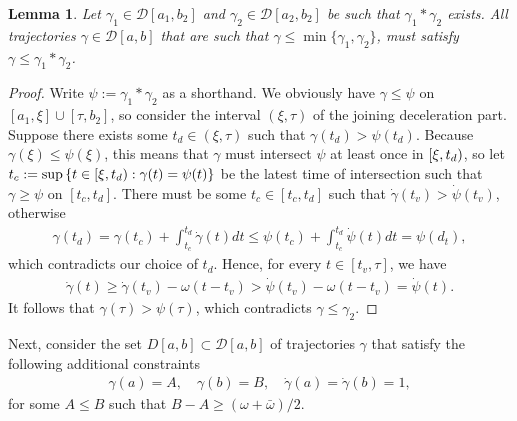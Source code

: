 \documentclass[a4paper]{article}
\theoremstyle{definition}
\theoremstyle{plain}
\newtheorem{lemma}{Lemma\hspace{0.25em}\ignorespaces}
\begin{document}
\begin{lemma}
  Let $\gamma_{1} \in \mathcal{D}[a_{1}, b_{2}]$ and
  $\gamma_{2} \in \mathcal{D}[a_{2}, b_{2}]$ be such that $\gamma_{1} * \gamma_{2}$ exists. All
  trajectories $\gamma \in \mathcal{D}[a, b]$ that are such that
  $\gamma \leq \min\{\gamma_{1}, \gamma_{2}\}$, must satisfy $\gamma \leq \gamma_{1} * \gamma_{2}$.
\end{lemma}
\begin{proof}
  Write $\psi := \gamma_{1} * \gamma_{2}$ as a shorthand. We obviously have
  $\gamma \leq \psi$ on $[a_{1}, \xi] \cup [\tau, b_{2}]$, so consider the interval $(\xi, \tau)$ of the joining
  deceleration part. Suppose there exists some $t_{d} \in (\xi, \tau)$ such that
  $\gamma(t_{d}) > \psi(t_{d})$. Because $\gamma(\xi) \leq \psi(\xi)$, this means that $\gamma$ must
  intersect $\psi$ at least once in $[\xi,t_{d})$, so let
  $t_{c} := \sup \, \{ t \in [\xi,t_{d}) : \gamma(t) = \psi(t) \}$ be the latest
  time of intersection such that $\gamma \geq \psi$ on $[t_{c}, t_{d}]$. There must be
  some $t_{c} \in [t_{c}, t_{d}]$ such that $\dot{\gamma}(t_{v}) > \dot{\psi}(t_{v})$, otherwise
  \begin{align*}
    \gamma(t_{d}) = \gamma(t_{c}) + \int_{t_{c}}^{t_{d}} \dot{\gamma}(t) dt \leq \psi(t_{c}) + \int_{t_{c}}^{t_{d}} \dot{\psi}(t) dt = \psi(d_{t}) ,
  \end{align*}
  which contradicts our choice of $t_{d}$. Hence, for every
  $t \in [t_{v}, \tau]$, we have
  \begin{align*}
    \dot{\gamma}(t) \geq \dot{\gamma}(t_{v}) - \omega (t - t_{v}) > \dot{\psi}(t_{v}) - \omega(t - t_{v}) = \dot{\psi}(t) .
  \end{align*}
  It follows that $\gamma(\tau) > \psi(\tau)$, which contradicts
  $\gamma \leq \gamma_{2}$.
\end{proof}

\newpage

Next, consider the set $D[a,b] \subset \mathcal{D}[a, b]$ of trajectories
$\gamma$ that satisfy the following additional constraints
\begin{align}
  \gamma(a) = A, \quad \gamma(b) = B, \quad \dot{\gamma}(a) = \dot{\gamma}(b) = 1 ,
\end{align}
for some $A \leq B$ such that $B - A \geq (\omega + \bar{\omega}) / 2$.
\end{document}
